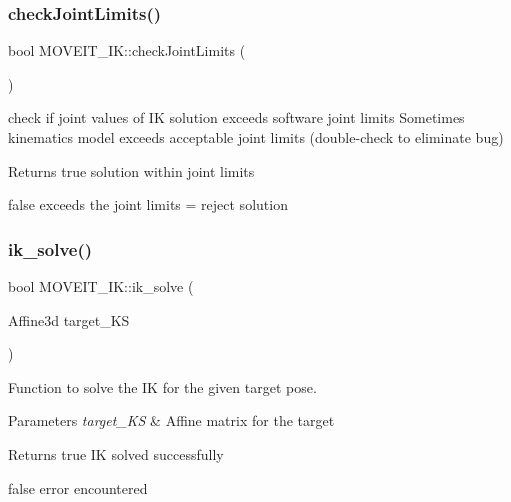 \subsubsection{\texorpdfstring{check\+Joint\+Limits()}{checkJointLimits()}}
{\footnotesize\ttfamily bool M\+O\+V\+E\+I\+T\+\_\+\+I\+K\+::check\+Joint\+Limits (\begin{DoxyParamCaption}{ }\end{DoxyParamCaption})\hspace{0.3cm}{\ttfamily [inline]}}



check if joint values of IK solution exceeds software joint limits Sometimes kinematics model exceeds acceptable joint limits (double-\/check to eliminate bug) 

\begin{DoxyReturn}{Returns}
true solution within joint limits 

false exceeds the joint limits = reject solution 
\end{DoxyReturn}
\mbox{\label{classMOVEIT__IK_a790708eba19044f34e00c2e78998ff09}} 
\subsubsection{\texorpdfstring{ik\+\_\+solve()}{ik\_solve()}}
{\footnotesize\ttfamily bool M\+O\+V\+E\+I\+T\+\_\+\+I\+K\+::ik\+\_\+solve (\begin{DoxyParamCaption}\item[{Affine3d}]{target\+\_\+\+KS }\end{DoxyParamCaption})\hspace{0.3cm}{\ttfamily [inline]}}



Function to solve the IK for the given target pose. 


\begin{DoxyParams}{Parameters}
{\em target\+\_\+\+KS} & Affine matrix for the target \\
\hline
\end{DoxyParams}
\begin{DoxyReturn}{Returns}
true IK solved successfully 

false error encountered 
\end{DoxyReturn}
\mbox{\label{classMOVEIT__IK_a93f8e535f8fbbe54100d8eecdd2ee6e4}} 
